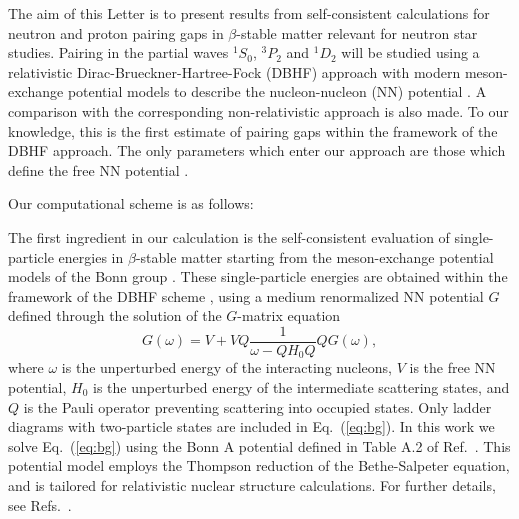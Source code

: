 The aim of this Letter  is to present results 
from self-consistent calculations for neutron and proton
pairing gaps in $\beta$-stable matter relevant for
neutron star studies. Pairing in 
the partial waves $^1S_0$, $^3P_2$ and $^1D_2$ will be studied using 
a relativistic Dirac-Brueckner-Hartree-Fock (DBHF) 
approach with  
modern meson-exchange potential models to describe the nucleon-nucleon
(NN) potential \cite{mac89}.
A comparison with the corresponding non-relativistic approach is
also made. 
To our knowledge, 
this is the first estimate of pairing gaps within the framework of the DBHF
approach. 
The only parameters which enter our approach are those which define the
free NN potential \cite{mac89}.

Our computational scheme is as follows:

The first ingredient in our calculation is the self-consistent
evaluation of single-particle energies in $\beta$-stable
matter starting from the meson-exchange potential models
of the Bonn group \cite{mac89}.  These single-particle
energies are obtained 
within the framework of the DBHF
scheme \cite{cs86,bm90,hko95}, 
using a medium renormalized NN potential $G$ defined through
the solution of the $G$-matrix equation 
\begin{equation}
       G(\omega )=V+VQ\frac{1}{\omega - QH_0Q}QG(\omega ),
       \label{eq:bg}
\end{equation}
where $\omega$ is the unperturbed energy of the interacting  nucleons,
$V$ is the free NN potential, $H_0$ is the unperturbed energy of the
intermediate scattering states,
and $Q$ is the Pauli
operator preventing scattering into occupied states.
Only ladder diagrams with two-particle states are included
in Eq.\ (\ref{eq:bg}).
In this work we solve Eq.\ (\ref{eq:bg}) using the Bonn A potential
defined in Table A.2 of Ref.\ \cite{mac89}. This potential model 
employs the Thompson \cite{bm90,thompson70} reduction of the
Bethe-Salpeter equation, and is tailored for relativistic
nuclear structure calculations. For further details, see 
Refs.\ \cite{mac89,bm90,hko95}.  


